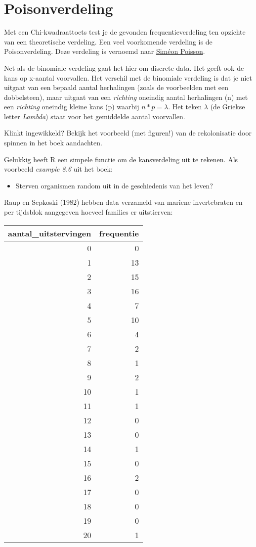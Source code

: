 \documentclass[]{book}
\providecommand{\tightlist}{%
  \setlength{\itemsep}{0pt}\setlength{\parskip}{0pt}}
\theoremstyle{definition}
\theoremstyle{definition}
\theoremstyle{definition}
\theoremstyle{remark}
\begin{document}
\section{Poisonverdeling}\label{poisonverdeling}

Met een Chi-kwadraattoets test je de gevonden frequentieverdeling ten
opzichte van een theoretische verdeling. Een veel voorkomende verdeling
is de Poisonverdeling. Deze verdeling is vernoemd naar
\href{https://nl.wikipedia.org/wiki/Sim\%C3\%A9on_Poisson}{Siméon
Poisson}.

Net als de binomiale verdeling gaat het hier om discrete data. Het geeft
ook de kans op x-aantal voorvallen. Het verschil met de binomiale
verdeling is dat je niet uitgaat van een bepaald aantal herhalingen
(zoals de voorbeelden met een dobbelsteen), maar uitgaat van een
\emph{richting} oneindig aantal herhalingen (n) met een \emph{richting}
oneindig kleine kans (p) waarbij \(n*p=\lambda\). Het teken \(\lambda\)
(de Griekse letter \emph{Lambda}) staat voor het gemiddelde aantal
voorvallen.

Klinkt ingewikkeld? Bekijk het voorbeeld (met figuren!) van de
rekolonisatie door spinnen in het boek aandachten.

Gelukkig heeft R een simpele functie om de kansverdeling uit te rekenen.
Als voorbeeld \emph{example 8.6} uit het boek:

\begin{itemize}
\tightlist
\item
  Sterven organismen random uit in de geschiedenis van het leven?
\end{itemize}

Raup en Sepkoski (1982) hebben data verzameld van mariene invertebraten
en per tijdsblok aangegeven hoeveel families er uitstierven:

\begin{tabular}{r|r}
\hline
aantal\_uitstervingen & frequentie\\
\hline
0 & 0\\
\hline
1 & 13\\
\hline
2 & 15\\
\hline
3 & 16\\
\hline
4 & 7\\
\hline
5 & 10\\
\hline
6 & 4\\
\hline
7 & 2\\
\hline
8 & 1\\
\hline
9 & 2\\
\hline
10 & 1\\
\hline
11 & 1\\
\hline
12 & 0\\
\hline
13 & 0\\
\hline
14 & 1\\
\hline
15 & 0\\
\hline
16 & 2\\
\hline
17 & 0\\
\hline
18 & 0\\
\hline
19 & 0\\
\hline
20 & 1\\
\hline
\end{tabular}
\end{document}

